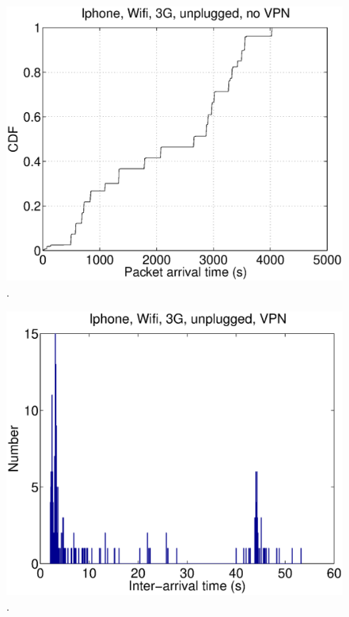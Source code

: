 \begin{figure}
\centering
        \includegraphics[width=0.8\linewidth]{../../code/pushNotification/Fig/bw_iphone_wifi_3g_unplug_novpn_ts.eps}
  \caption{.}
  \label{fig:}
\end{figure}

\begin{figure}
\centering
        \includegraphics[width=0.8\linewidth]{../../code/pushNotification/Fig/bw_iphone_wifi_3g_unplug_vpn_interTs.eps}
  \caption{.}
  \label{fig:}
\end{figure}

